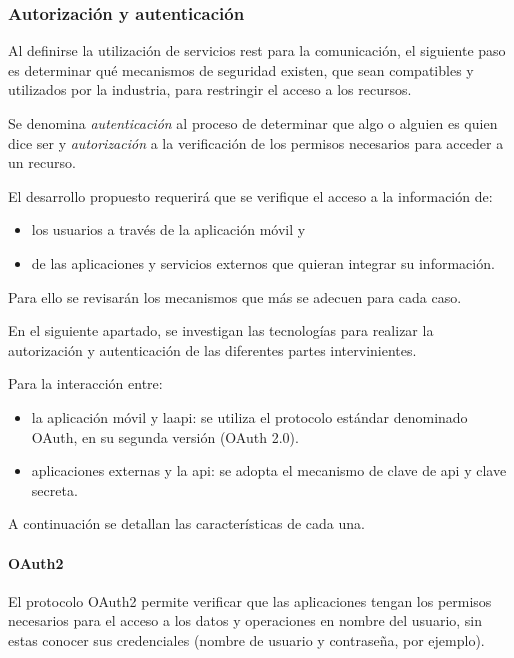 \subsubsection{Autorización y autenticación}
\label{autorizacion_autenticacion}

Al definirse la utilización de servicios \gls{rest} para la comunicación, el siguiente paso es determinar qué mecanismos de seguridad existen, que sean compatibles y utilizados por la industria, para restringir el acceso a los recursos.

Se denomina \textit{autenticación} al proceso de determinar que algo o alguien es quien dice ser y \textit{autorización} a la verificación de los permisos necesarios para acceder a un recurso\cite{authAuth}.

El desarrollo propuesto requerirá que se verifique el acceso a la información de:
\begin{itemize}
\item los usuarios a través de la aplicación  móvil y 
\item de las aplicaciones y servicios externos que quieran integrar su información.
\end{itemize}
Para ello se revisarán los mecanismos que más se adecuen para cada caso.

En el siguiente apartado, se investigan las tecnologías para realizar la autorización y autenticación de las diferentes partes intervinientes. 

Para la interacción entre:
\begin{itemize}
\item la aplicación móvil y la\gls{api}: se utiliza el protocolo estándar denominado OAuth, en su segunda versión (OAuth 2.0).
\item aplicaciones externas y la \gls{api}: se adopta el mecanismo de clave de \gls{api} y clave secreta.
\end{itemize}
A continuación se detallan las características de cada una.

\paragraph{OAuth2}
\label{oauth}

El protocolo OAuth2 permite verificar que las aplicaciones tengan los permisos necesarios para el acceso a los datos y operaciones en nombre del usuario, sin estas conocer sus credenciales (nombre de usuario y contraseña, por ejemplo)\cite{hardt2012oauth}.

